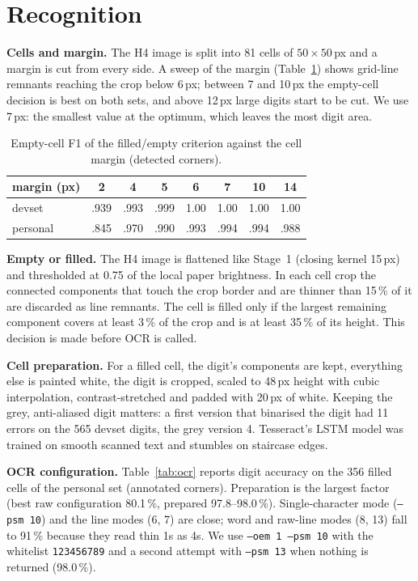 \documentclass[conference]{IEEEtran}
\begin{document}
\section{Recognition}
\textbf{Cells and margin.} The H4 image is split into 81 cells of $50\times50$\,px and a margin
is cut from every side. A sweep of the margin (Table~\ref{tab:margin}) shows grid-line remnants
reaching the crop below 6\,px; between 7 and 10\,px the empty-cell decision is best on both
sets, and above 12\,px large digits start to be cut. We use 7\,px: the smallest value at the
optimum, which leaves the most digit area.

\begin{table}[t]
\centering
\caption{Empty-cell F1 of the filled/empty criterion against the cell margin (detected corners).}
\label{tab:margin}
\footnotesize
\begin{tabular}{@{}lccccccc@{}}
\toprule
margin (px) & 2 & 4 & 5 & 6 & 7 & 10 & 14\\
\midrule
devset & .939 & .993 & .999 & 1.00 & 1.00 & 1.00 & 1.00\\
personal & .845 & .970 & .990 & .993 & .994 & .994 & .988\\
\bottomrule
\end{tabular}
\end{table}

\textbf{Empty or filled.} The H4 image is flattened like Stage~1 (closing kernel 15\,px) and
thresholded at 0.75 of the local paper brightness. In each cell crop the connected components
that touch the crop border and are thinner than 15\,\% of it are discarded as line remnants. The
cell is filled only if the largest remaining component covers at least 3\,\% of the crop and is
at least 35\,\% of its height. This decision is made before OCR is called.

\textbf{Cell preparation.} For a filled cell, the digit's components are kept, everything else
is painted white, the digit is cropped, scaled to 48\,px height with cubic interpolation,
contrast-stretched and padded with 20\,px of white. Keeping the grey, anti-aliased digit
matters: a first version that binarised the digit had 11 errors on the 565 devset digits, the
grey version 4. Tesseract's LSTM model was trained on smooth scanned text and stumbles on
staircase edges.

\textbf{OCR configuration.} Table~\ref{tab:ocr} reports digit accuracy on the 356 filled cells
of the personal set (annotated corners). Preparation is the largest factor (best raw
configuration 80.1\,\%, prepared 97.8--98.0\,\%). Single-character mode (\texttt{--psm 10}) and
the line modes (6, 7) are close; word and raw-line modes (8, 13) fall to 91\,\% because they
read thin 1s as 4s. We use \texttt{--oem 1 --psm 10} with the whitelist \texttt{123456789} and a
second attempt with \texttt{--psm 13} when nothing is returned (98.0\,\%).
\end{document}
